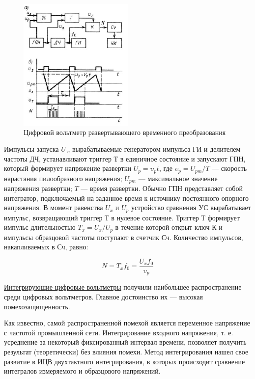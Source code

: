 \documentclass[unicode, 12pt, a4paper, oneside]{article}
\begin{document}
\begin{figure}[H]
\centering
\includegraphics[width=0.5\textwidth]{55_1.jpg}
\caption{Цифровой вольтметр развертывающего временного преобразования}
\end{figure}

Импульсы запуска $U_\text{з}$, вырабатываемые генератором импульса ГИ и делителем частоты ДЧ, устанавливают триггер Т в единичное состояние и запускают ГПН, который формирует напряжение развертки $U_p=\upsilon_p t$, где $\upsilon_p =U_{pm}/T$ — скорость нарастания пилообразного напряжения; $U_{pm}$ — максимальное значение напряжения развертки; $T$ — время развертки. Обычно ГПН представляет собой интегратор, подключаемый на заданное время к источнику постоянного опорного напряжения. В момент равенства $U_x$ и $U_p$ устройство сравнения УС вырабатывает импульс, возвращающий триггер Т в нулевое состояние. Триггер Т формирует импульс длительностью $T_x=U_x/U_p$ в течение которой открыт ключ К и импульсы образцовой частоты поступают в счетчик Сч. Количество импульсов, накапливаемых в Сч, равно: 

\begin{displaymath}
N = T_x f_0 = \frac{U_x f_0}{\upsilon_p}
\end{displaymath}

\underline{Интегрирующие цифровые вольтметры} получили наибольшее распространение среди цифровых вольтметров. Главное достоинство их — высокая помехозащищенность.

Как известно, самой распространенной помехой является переменное напряжение с частотой промышленной сети.
Интегрирование входного напряжения, т. е. усреднение за некоторый фиксированный интервал времени, позволяет получить результат (теоретически) без влияния помехи. Метод интегрирования нашел свое развитие в ИЦВ двухтактного интегрирования, в которых происходит сравнение интегралов измеряемого и образцового напряжений.
\end{document}
